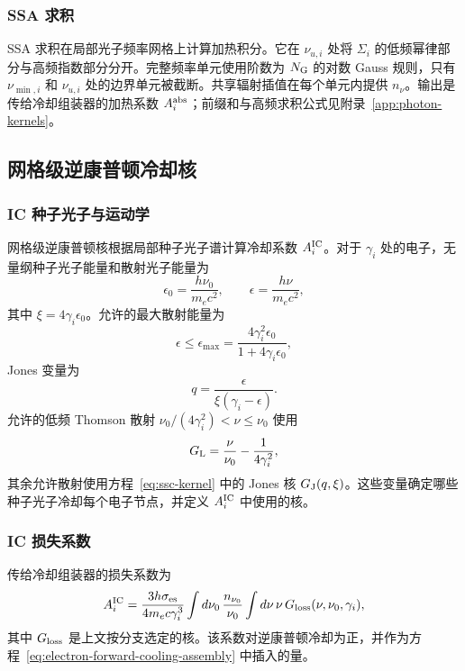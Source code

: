 \documentclass[twocolumn]{aastex702}
\begin{document}
\subsubsection{SSA 求积}

SSA 求积在局部光子频率网格上计算加热积分。它在 \(\nu_{u,i}\) 处将 \(\Sigma_i\) 的低频幂律部分与高频指数部分分开。完整频率单元使用阶数为 \(N_{\rm G}\) 的对数 Gauss 规则，只有 \(\nu_{\min,i}\) 和 \(\nu_{u,i}\) 处的边界单元被截断。共享辐射插值在每个单元内提供 \(n_\nu\)。输出是传给冷却组装器的加热系数 \(A_i^{\rm abs}\)；前缀和与高频求积公式见附录~\ref{app:photon-kernels}。

\subsection{网格级逆康普顿冷却核}

\subsubsection{IC 种子光子与运动学}

网格级逆康普顿核根据局部种子光子谱计算冷却系数 \(A_i^{\rm IC}\)。对于 \(\gamma_i\) 处的电子，无量纲种子光子能量和散射光子能量为
\begin{equation}
\epsilon_0=\frac{h\nu_0}{m_e c^2},\qquad
\epsilon=\frac{h\nu}{m_e c^2},
\end{equation}
其中 \(\xi=4\gamma_i\epsilon_0\)。允许的最大散射能量为
\begin{equation}
\epsilon\le
\epsilon_{\max}=\frac{4\gamma_i^2\epsilon_0}
{1+4\gamma_i\epsilon_0},
\end{equation}
Jones 变量为
\begin{equation}
q=\frac{\epsilon}{\xi(\gamma_i-\epsilon)} .
\end{equation}
允许的低频 Thomson 散射 \(\nu_0/(4\gamma_i^2)<\nu\le\nu_0\) 使用
\begin{equation}
G_{\rm L}=\frac{\nu}{\nu_0}-\frac{1}{4\gamma_i^2},
\end{equation}
其余允许散射使用方程~\eqref{eq:ssc-kernel} 中的 Jones 核 \(G_{\rm J}(q,\xi)\)。这些变量确定哪些种子光子冷却每个电子节点，并定义 \(A_i^{\rm IC}\) 中使用的核。

\subsubsection{IC 损失系数}

传给冷却组装器的损失系数为
\begin{equation}
A_i^{\rm IC}=
\frac{3h\sigma_{\rm es}}{4m_e c\gamma_i^3}
\int d\nu_0\,\frac{n_{\nu_0}}{\nu_0}
\int d\nu\,\nu\,G_{\rm loss}(\nu,\nu_0,\gamma_i),
\end{equation}
其中 \(G_{\rm loss}\) 是上文按分支选定的核。该系数对逆康普顿冷却为正，并作为方程~\eqref{eq:electron-forward-cooling-assembly} 中插入的量。
\end{document}
